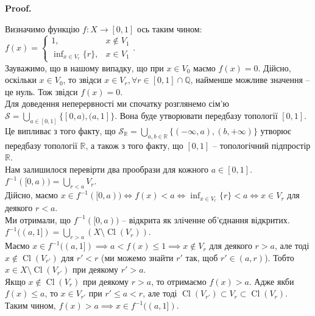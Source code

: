 \documentclass[a4paper, 10pt]{article}
\makeatletter
\theoremstyle{theoremdd}
\DeclareMathOperator{\Cl}{Cl}
\renewenvironment{proof}[1][Proof.\\]{\par
\pushQED{\hfill \qed}%
\normalfont \topsep6\p@\@plus6\p@\relax
\trivlist
\item\relax
{\bfseries
#1\@addpunct{.}}\hspace\labelsep\ignorespaces
}{%
\popQED\endtrivlist\@endpefalse
}
\makeatother
\begin{document}
\begin{proof}
Визначимо функцію $f \colon X \to [0,1]$ ось таким чином: $f(x) = \begin{cases} 1, & x \notin V_1 \\ \inf_{x \in V_r} \{r\}, & x \in V_1 \end{cases}$. \\
Зауважимо, що в нашому випадку, що при $x \in V_0$ маємо $f(x) = 0$. Дійсно, оскільки $x \in V_0$, то звідси $x \in V_r, \forall r \in [0,1] \cap \mathbb{Q}$, найменше можливе значення -- це нуль. Тож звідси $f(x) = 0$.\\
Для доведення неперервності ми спочатку розглянемо сім'ю $\mathcal{S} = \displaystyle\bigcup_{a \in [0,1]} \{ [0,a), (a,1] \}$. Вона буде утворювати передбазу топології $[0,1]$. Це випливає з того факту, що $\mathcal{S}_{\mathbb{R}} = \displaystyle\bigcup_{a,b \in \mathbb{R}} \{(-\infty,a), (b,+\infty)\}$ утворює передбазу топології $\mathbb{R}$, а також з того факту, що $[0,1]$ -- топологічний підпростір $\mathbb{R}$.\\
Нам залишилося перевірти два прообрази для кожного $a \in [0,1]$.\\
$f^{-1}([0,a)) = \displaystyle\bigcup_{r < a} V_r$. \\
Дійсно, маємо $x \in f^{-1}([0,a)) \iff f(x) < a \iff \displaystyle\inf_{x \in V_r} \{r\} < a \iff x \in V_r$ для деякого $r < a$.\\
Ми отримали, що $f^{-1}([0,a))$ -- відкрита як зліченне об'єднання відкритих.\\
$f^{-1}((a,1]) = \displaystyle\bigcup_{r > a} (X \setminus \Cl(V_r))$.\\
Маємо $x \in f^{-1}((a,1]) \implies a < f(x) \leq 1 \implies x \notin V_r$ для деякого $r > a$, але тоді $x \notin \Cl(V_{r'})$ для $r' < r$ (ми можемо знайти $r'$ так, щоб $r' \in (a,r)$). Тобто $x \in X \setminus \Cl(V_{r'})$ при деякому $r' > a$.\\
Якщо $x \notin \Cl(V_r)$ при деякому $r > a$, то отримаємо $f(x) > a$. Адже якби $f(x) \leq a$, то $x \in V_{r'}$ при $r' \leq a < r$, але тоді $\Cl(V_{r'}) \subset V_r \subset \Cl(V_r)$. Таким чином, $f(x) > a \implies x \in f^{-1}((a,1])$.
\end{proof}
\end{document}
